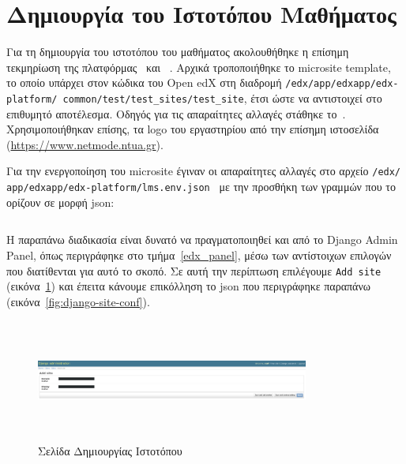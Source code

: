 \documentclass[12pt]{report}
\begin{document}
\section{Δημιουργία του Ιστοτόπου Μαθήματος}
Για τη δημιουργία του ιστοτόπου του μαθήματος ακολουθήθηκε η επίσημη τεκμηρίωση της πλατφόρμας~\cite{edxdata_package_1} και ~\cite{microsites_1}. Αρχικά τροποποιήθηκε το \textlatin{microsite template}, το οποίο υπάρχει στον κώδικα του \textlatin{Open edX} στη διαδρομή \textlatin{\texttt{/edx/app/edxapp/edx-platform/ common/test/test\_sites/test\_site}}, έτσι ώστε να αντιστοιχεί στο επιθυμητό αποτέλεσμα. Οδηγός για τις απαραίτητες αλλαγές στάθηκε το~\cite{microsites_1}. Χρησιμοποιήθηκαν επίσης, τα \textlatin{logo} του εργαστηρίου από την επίσημη ιστοσελίδα (\textlatin{\url{https://www.netmode.ntua.gr}}).

Για την ενεργοποίηση του \textlatin{microsite} έγιναν οι απαραίτητες αλλαγές στο αρχείο \textlatin{\texttt{/edx/ app/edxapp/edx-platform/lms.env.json}}~\cite{microsites_1} με την προσθήκη των γραμμών που το ορίζουν σε μορφή \textlatin{json}:
\inputminted[linenos, fontsize=\scriptsize, breaklines, baselinestretch=1, firstline=24, lastline=55]{json}{edx-microsite/README.md}

Η παραπάνω διαδικασία είναι δυνατό να πραγματοποιηθεί και από το \textlatin{Django Admin Panel}, όπως περιγράφηκε στο τμήμα~\ref{edx_panel}, μέσω των αντίστοιχων επιλογών που διατίθενται για αυτό το σκοπό. Σε αυτή την περίπτωση επιλέγουμε \textlatin{\texttt{Add site}} (εικόνα~\ref{fig:django-new-site}) και έπειτα κάνουμε επικόλληση το \textlatin{json} που περιγράφηκε παραπάνω (εικόνα~\ref{fig:django-site-conf}).

\begin{figure}[!htbp]
\centering
\includegraphics[width=0.8\textwidth, height=4cm]{django-new-site}
\caption{Σελίδα Δημιουργίας Ιστοτόπου}
\label{fig:django-new-site}
\end{figure}
\end{document}
